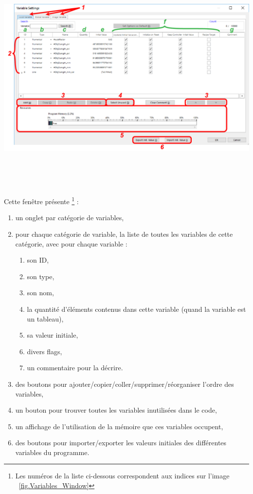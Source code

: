 \noindent
\begin{minipage}[c]{\textwidth}
  \centering
  \includegraphics[width=16cm, height=10cm, keepaspectratio]{addOns/LaboCalib_Variables_Window.png}
  \label{fig.Variables_Window}
\end{minipage}\\
\vspace{0.2cm}

\noindent Cette fenêtre présente \footnote{Les numéros de la liste ci-dessous
correspondent aux indices sur l'image ~\ref{fig.Variables_Window}} :
\begin{enumerate}
  \item un onglet par catégorie de variables,
  \item pour chaque catégorie de variable, la liste de toutes les variables de cette
  catégorie, avec pour chaque variable :
  \begin{enumerate}
    \item son ID,
    \item son type,
    \item son nom,
    \item la quantité d’éléments contenus dans cette variable (quand la variable est 
    un tableau),
	\item sa valeur initiale,
	\item divers flags,
    \item un commentaire pour la décrire.  
  \end{enumerate}

  \item des boutons pour ajouter/copier/coller/supprimer/réorganiser l’ordre des
  variables,
   \item un bouton pour trouver toutes les variables inutilisées dans le code,
   \item un affichage de l’utilisation de la mémoire que ces variables occupent,
   \item des boutons pour importer/exporter les valeurs initiales des différentes
   variables du programme.
\end{enumerate}
\vspace{0.2cm}


